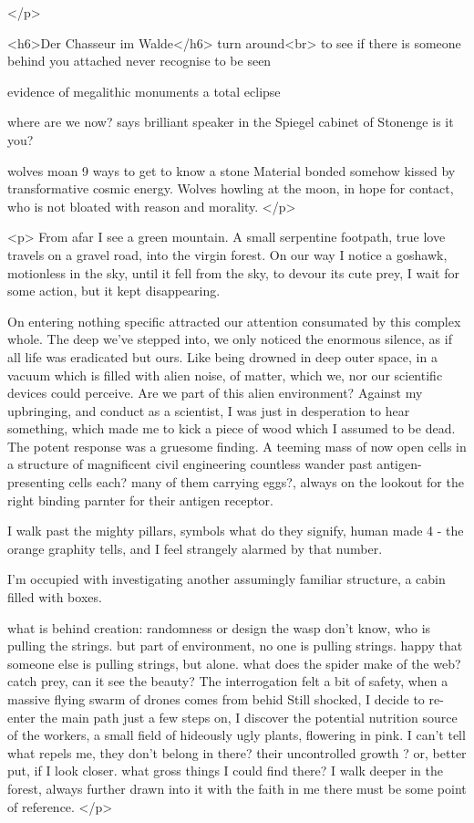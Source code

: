 \documentclass{article}
\begin{document}
</p>


<h6>Der Chasseur im Walde</h6>
turn around<br>
to see if there is someone behind you
attached 
never recognise to be seen

evidence of megalithic monuments
a total eclipse

where are we now?
says brilliant speaker
in the Spiegel cabinet 
of Stonenge
is it you?

wolves moan 
9 ways to get to know a stone
Material bonded somehow
kissed by transformative cosmic energy.
Wolves howling at the moon, in hope for contact, 
who is not bloated with reason and morality. 
</p>

<p>
From afar I see a green mountain.
A small serpentine footpath, true love travels on a gravel road, 
into the virgin forest. 
On our way I notice a goshawk, motionless in the sky, until it fell from the sky, 
to devour its cute prey,
I wait for some action, but it kept disappearing.



On entering nothing specific attracted our attention 
consumated by this complex whole.
The deep we've stepped into, we only noticed the enormous silence, 
as if all life was eradicated but ours. 
Like being drowned in deep outer space, in a vacuum which is filled
with alien noise, of matter, which we, nor our scientific devices  could perceive.
Are we part of this alien environment?
Against my upbringing, and conduct as a scientist, 
I was just in desperation to hear something, which made me to kick a piece of wood
which I assumed to be dead.
The potent response was a gruesome finding. 
A teeming mass of now open cells in 
a structure of magnificent civil engineering  countless
wander past antigen-presenting cells 
each? many of them carrying eggs?, always on the lookout
for the right binding parnter for their antigen receptor.  

I walk past the mighty pillars, symbols what do they signify, human made
4 - the orange graphity tells, and I feel strangely alarmed by that number. 

I'm occupied with investigating another assumingly familiar structure,
a cabin filled with boxes. 


what is behind creation: randomness or design 
the wasp don't know, who is pulling the strings.
but part of environment, no one is pulling strings.
happy that someone else is pulling strings, but alone.
what does the spider make of the web? 
catch prey, 
can it see the beauty?
The interrogation felt a bit of safety,
when a massive flying swarm of drones comes from behid
Still shocked, I decide  to re-enter the main path
just a few steps on, I discover the potential nutrition source of the workers,
a small field of hideously  ugly plants, flowering in pink.
I can't tell what repels me, they don't belong in there?
their uncontrolled growth ? or, better put, if I look closer. 
what gross things I could find there? 
I walk deeper in the forest, always further drawn into it
with the faith in me
there must be some point of reference.
</p>
\end{document}
